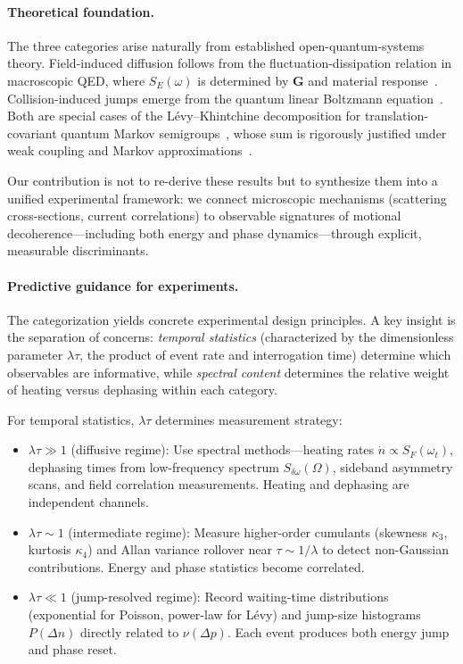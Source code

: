 \paragraph{Theoretical foundation.}
The three categories arise naturally from established open-quantum-systems theory. Field-induced diffusion follows from the fluctuation-dissipation relation in macroscopic QED, where $S_E(\omega)$ is determined by $\mathbf{G}$ and material response~\cite{ScheelBuhmann2008,Brownnutt2015,BuhmannDispersionForcesII}. Collision-induced jumps emerge from the quantum linear Boltzmann equation~\cite{HornbergerSipe2003,VacchiniHornberger2009,OghittuNJPhys2023}. Both are special cases of the L\'evy--Khintchine decomposition for translation-covariant quantum Markov semigroups~\cite{Holevo1993,VacchiniJMathPhys2001}, whose sum is rigorously justified under weak coupling and Markov approximations~\cite{BreuerPetruccione2002}. 

Our contribution is not to re-derive these results but to synthesize them into a unified experimental framework: we connect microscopic mechanisms (scattering cross-sections, current correlations) to observable signatures of motional decoherence—including both energy and phase dynamics—through explicit, measurable discriminants.

\paragraph{Predictive guidance for experiments.}
The categorization yields concrete experimental design principles. A key insight is the separation of concerns: \emph{temporal statistics} (characterized by the dimensionless parameter $\lambda\tau$, the product of event rate and interrogation time) determine which observables are informative, while \emph{spectral content} determines the relative weight of heating versus dephasing within each category.

For temporal statistics, $\lambda\tau$ determines measurement strategy:
\begin{itemize}[leftmargin=*,nosep]
\item $\lambda\tau \gg 1$ (diffusive regime): Use spectral methods—heating rates $\dot{n} \propto S_F(\omega_t)$, dephasing times from low-frequency spectrum $S_{\delta\omega}(\Omega)$, sideband asymmetry scans, and field correlation measurements. Heating and dephasing are independent channels.

\item $\lambda\tau \sim 1$ (intermediate regime): Measure higher-order cumulants (skewness $\kappa_3$, kurtosis $\kappa_4$) and Allan variance rollover near $\tau \sim 1/\lambda$ to detect non-Gaussian contributions. Energy and phase statistics become correlated.

\item $\lambda\tau \ll 1$ (jump-resolved regime): Record waiting-time distributions (exponential for Poisson, power-law for L\'evy) and jump-size histograms $P(\Delta n)$ directly related to $\nu(\Delta p)$. Each event produces both energy jump and phase reset.
\end{itemize}

